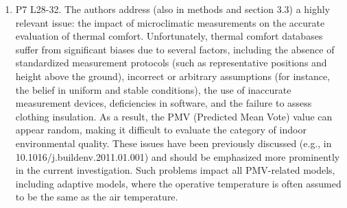 \documentclass[a4paper, 10pt]{letter}
\begin{document}
\begin{letter}
\begin{enumerate}
            \item P7 L28-32.
            The authors address (also in methods and section 3.3) a highly relevant issue: the impact of microclimatic measurements on the accurate evaluation of thermal comfort.
            Unfortunately, thermal comfort databases suffer from significant biases due to several factors, including the absence of standardized measurement protocols (such as representative positions and height above the ground), incorrect or arbitrary assumptions (for instance, the belief in uniform and stable conditions), the use of inaccurate measurement devices, deficiencies in software, and the failure to assess clothing insulation.
            As a result, the PMV (Predicted Mean Vote) value can appear random, making it difficult to evaluate the category of indoor environmental quality.
            These issues have been previously discussed (e.g., in 10.1016/j.buildenv.2011.01.001) and should be emphasized more prominently in the current investigation.
            Such problems impact all PMV-related models, including adaptive models, where the operative temperature is often assumed to be the same as the air temperature.


\end{enumerate}
\end{letter}
\end{document}
